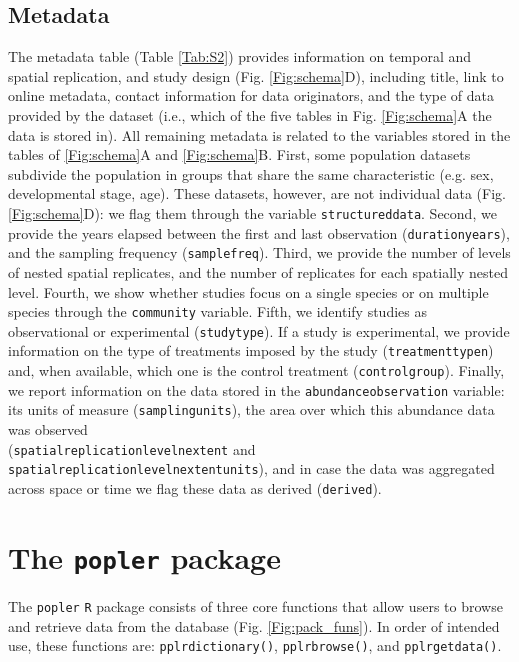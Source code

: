 \documentclass{article}\usepackage[]{graphicx}\usepackage[]{color}
\begin{document}
\subsection*{Metadata}
The metadata table (Table \ref{Tab:S2}) provides information on temporal and spatial replication, and study design (Fig. \ref{Fig:schema}D), including title, link to online metadata, contact information for data originators, and the type of data provided by the dataset (i.e., which of the five tables in Fig. \ref{Fig:schema}A the data is stored in). All remaining metadata is related to the variables stored in the tables of \ref{Fig:schema}A and \ref{Fig:schema}B. First, some population datasets subdivide the population in groups that share the same characteristic (e.g. sex, developmental stage, age). These datasets, however, are not individual data (Fig. \ref{Fig:schema}D): we flag them through the variable \texttt{structured\textunderscore data}. Second, we provide the years elapsed between the first and last observation (\texttt{duration\textunderscore years}), and the sampling frequency (\texttt{samplefreq}). Third, we provide the number of levels of nested spatial replicates, and the number of replicates for each spatially nested level. Fourth, we show whether studies focus on a single species or on multiple species through the \texttt{community} variable. Fifth, we identify studies as observational or experimental (\texttt{studytype}). If a study is experimental, we provide information on the type of treatments imposed by the study (\texttt{treatment\textunderscore type\textunderscore n}) and, when available, which one is the control treatment (\texttt{control\textunderscore group}). Finally, we report information on the data stored in the \texttt{abundance\textunderscore observation} variable: its units of measure (\texttt{samplingunits}), the area over which this abundance data was observed\\ (\texttt{spatial\textunderscore replication\textunderscore level\textunderscore n\textunderscore extent} and\\ \texttt{spatial\textunderscore replication\textunderscore level\textunderscore n\textunderscore extent\textunderscore units}), and in case the data was aggregated across space or time we flag these data as derived (\texttt{derived}).

\section*{The \texttt{popler} package}
The \texttt{popler} \texttt{R} package consists of three core functions that allow users to browse and retrieve data from the database (Fig. \ref{Fig:pack_funs}). In order of intended use, these functions are: \texttt{pplr\textunderscore dictionary()}, \texttt{pplr\textunderscore browse()}, and \texttt{pplr\textunderscore getdata()}.
\end{document}
